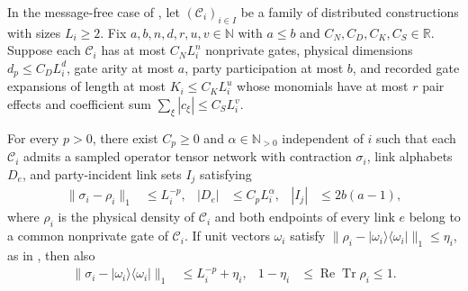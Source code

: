 \begin{theorem}
    \label{thm:peps_separate_arity_compression}
    \leanok
    In the message-free case of \cite[Theorem~5.2]{OpenAI2026PolynomialPEPS},
    let $(\mathcal C_i)_{i\in I}$ be a family of distributed constructions with
    sizes $L_i\ge2$. Fix $a,b,n,d,r,u,v\in\mathbb N$ with $a\le b$ and
    $C_N,C_D,C_K,C_S\in\mathbb R$. Suppose each $\mathcal C_i$ has at most
    $C_NL_i^n$ nonprivate gates, physical dimensions $d_p\le C_DL_i^d$, gate
    arity at most $a$, party participation at most $b$, and recorded gate
    expansions of length at most $K_i\le C_KL_i^u$ whose monomials have at most
    $r$ pair effects and coefficient sum $\sum_\xi|c_\xi|\le C_SL_i^v$.

    For every $p>0$, there exist $C_p\ge0$ and $\alpha\in\mathbb N_{>0}$
    independent of $i$ such that each $\mathcal C_i$ admits a sampled operator
    tensor network with contraction $\sigma_i$, link alphabets $D_e$, and
    party-incident link sets $I_j$ satisfying
    \begin{align}
        \|\sigma_i-\rho_i\|_1 & \le L_i^{-p},      &
        |D_e|                 & \le C_pL_i^\alpha, & |I_j| & \le2b(a-1),
        \label{eq:peps_separate_arity_network}
    \end{align}
    where $\rho_i$ is the physical density of $\mathcal C_i$ and both endpoints
    of every link $e$ belong to a common nonprivate gate of $\mathcal C_i$.
    If unit vectors $\omega_i$ satisfy
    $\|\rho_i-|\omega_i\rangle\langle\omega_i|\|_1\le\eta_i$, as in
    \cite[Remark~5.3]{OpenAI2026PolynomialPEPS}, then also
    \begin{align}
        \|\sigma_i-|\omega_i\rangle\langle\omega_i|\|_1
                 & \le L_i^{-p}+\eta_i,                             &
        1-\eta_i & \le\operatorname{Re}\operatorname{Tr}\rho_i\le1.
        \label{eq:peps_separate_arity_pure}
    \end{align}
\end{theorem}
